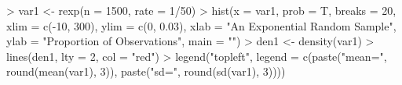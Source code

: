 \begin{Schunk}
\begin{Sinput}
> var1 <- rexp(n = 1500, rate = 1/50)
> hist(x = var1, prob = T, breaks = 20, xlim = c(-10, 
      300), ylim = c(0, 0.03), xlab = "An Exponential Random Sample", 
      ylab = "Proportion of Observations", main = "")
> den1 <- density(var1)
> lines(den1, lty = 2, col = "red")
> legend("topleft", legend = c(paste("mean=", round(mean(var1), 
      3)), paste("sd=", round(sd(var1), 3))))
\end{Sinput}
\end{Schunk}
